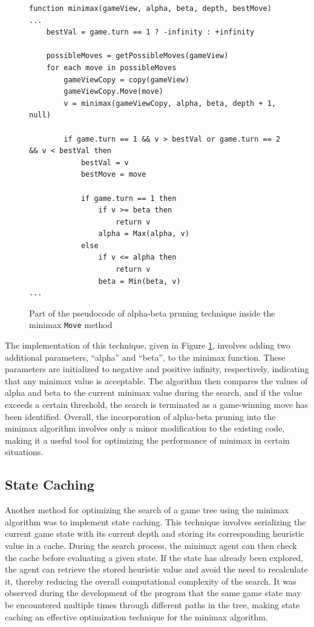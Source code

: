 \begin{figure}[h]
\captionsetup{justification=centering}
\begin{lstlisting}
function minimax(gameView, alpha, beta, depth, bestMove)
...
    bestVal = game.turn == 1 ? -infinity : +infinity
	
    possibleMoves = getPossibleMoves(gameView)
    for each move in possibleMoves
        gameViewCopy = copy(gameView)
        gameViewCopy.Move(move)
        v = minimax(gameViewCopy, alpha, beta, depth + 1, null)
        	
        if game.turn == 1 && v > bestVal or game.turn == 2 && v < bestVal then
            bestVal = v
            bestMove = move
        		
            if game.turn == 1 then 
                if v >= beta then 
                    return v
                alpha = Max(alpha, v)
            else
                if v <= alpha then
                    return v
                beta = Min(beta, v)
...
\end{lstlisting}
\caption{Part of the pseudocode of alpha-beta pruning technique inside the minimax \texttt{Move} method}
\label{fig:alphabeta}
\end{figure}

The implementation of this technique, given in Figure \ref{fig:alphabeta}, involves adding two additional parameters, ``alpha'' and ``beta'', to the minimax function. These parameters are initialized to negative and positive infinity, respectively, indicating that any minimax value is acceptable. The algorithm then compares the values of alpha and beta to the current minimax value during the search, and if the value exceeds a certain threshold, the search is terminated as a game-winning move has been identified. Overall, the incorporation of alpha-beta pruning into the minimax algorithm involves only a minor modification to the existing code, making it a useful tool for optimizing the performance of minimax in certain situations.

\subsection{State Caching}

Another method for optimizing the search of a game tree using the minimax algorithm was to implement state caching. This technique involves serializing the current game state with its current depth and storing its corresponding heuristic value in a cache. During the search process, the minimax agent can then check the cache before evaluating a given state. If the state has already been explored, the agent can retrieve the stored heuristic value and avoid the need to recalculate it, thereby reducing the overall computational complexity of the search. It was observed during the development of the program that the same game state may be encountered multiple times through different paths in the tree, making state caching an effective optimization technique for the minimax algorithm.

